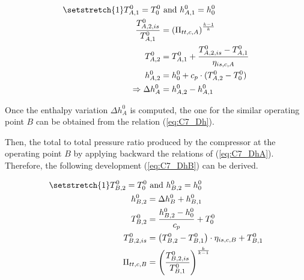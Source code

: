 \begin{align}
\setstretch{1}
    T_{A,1}^0 = T_{0}^0 &\text{ and } h_{A,1}^0 = h_{0}^0\nonumber\\
    \frac{T_{A,2,is}^0}{T_{A,1}^0} &= \left(\Pi_{tt,c,A}\right)^{\frac{k-1}{k}}\nonumber\\
    T_{A,2}^0 &= T_{A,1}^0 + \frac{T_{A,2,is}^0 - T_{A,1}^0}{\eta_{is,c,A}}\label{eq:C7_DhA}\\
    h_{A,2}^0 &= h_{0}^0 + c_p\cdot (T_{A,2}^0 - T_{0}^0)\nonumber\\
    \Rightarrow \Delta h_A^0 &= h_{A,2}^0  - h_{A,1}^0\nonumber
\end{align}

Once the enthalpy variation $\Delta h_A^0$ is computed, the one for the similar operating point $B$ can be obtained from the relation (\ref{eq:C7_Dh}).

Then, the total to total pressure ratio produced by the compressor at the operating point $B$ by applying backward the relations of (\ref{eq:C7_DhA}). Therefore, the following development (\ref{eq:C7_DhB}) can be derived.

\begin{align}
\setstretch{1}
    T_{B,2}^0 = T_{0}^0 &\text{ and } h_{B,2}^0 = h_{0}^0\nonumber\\
    h_{B,2}^0 &= \Delta h_B^0 + h_{B,1}^0\nonumber\\
    T_{B,2}^0 &= \frac{h_{B,2}^0 - h_{0}^0}{c_p} + T_0^0\label{eq:C7_DhB}\\
    T_{B,2,is}^0 &= \left(T_{B,2}^0 - T_{B,1}^0\right)\cdot \eta_{is,c,B} + T_{B,1}^0\nonumber\\
    \Pi_{tt,c,B} &= \left(\frac{T_{B,2,is}^0}{T_{B,1}^0}\right)^{\frac{k}{k-1}}\nonumber
\end{align}

